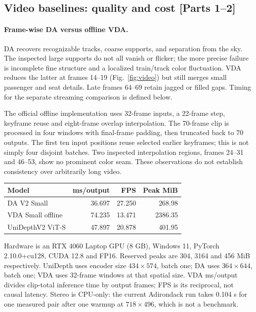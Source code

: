 \documentclass[10pt,twocolumn,letterpaper]{article}
\begin{document}
\subsection{Video baselines: quality and cost [Parts 1--2]}
\label{sec:video}
\paragraph{Frame-wise DA versus offline VDA.}
DA recovers recognizable tracks, coarse supports, and separation from the sky. The inspected large supports do not all vanish or flicker; the more precise failure is incomplete fine structure and a localized train/track color fluctuation. VDA reduces the latter at frames 14--19 (Fig.~\ref{fig:video}) but still merges small passenger and seat details. Late frames 64--69 retain jagged or filled gaps. Timing for the separate streaming comparison is defined below.

The official offline implementation uses 32-frame inputs, a 22-frame step, keyframe reuse and eight-frame overlap interpolation. The 70-frame clip is processed in four windows with final-frame padding, then truncated back to 70 outputs. The first ten input positions reuse selected earlier keyframes; this is not simply four disjoint batches. Two inspected interpolation regions, frames 24--31 and 46--53, show no prominent color seam. These observations do not establish consistency over arbitrarily long video.

\begin{center}\begin{minipage}{\linewidth}\centering
{}
\label{tab:resources}
\small
\begin{tabular}{lrrr}
\toprule
Model & ms/output & FPS & Peak MiB\\
\midrule
DA V2 Small &36.697&27.250&268.98\\
VDA Small offline &74.235&13.471&2386.35\\
UniDepthV2 ViT-S &47.897&20.878&401.95\\
\bottomrule
\end{tabular}
\end{minipage}\end{center}

Hardware is an RTX 4060 Laptop GPU (8 GB), Windows 11, PyTorch 2.10.0+cu128, CUDA 12.8 and FP16. Reserved peaks are 304, 3164 and 456 MiB respectively. UniDepth uses encoder size $434\times574$, batch one; DA uses $364\times644$, batch one; VDA uses 32-frame windows at that spatial size. VDA ms/output divides clip-total inference time by output frames; FPS is its reciprocal, not causal latency. Stereo is CPU-only: the current Adirondack run takes 0.104 s for one measured pair after one warmup at $718\times496$, which is not a benchmark.
\end{document}
